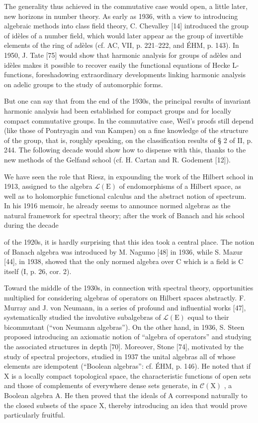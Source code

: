 The generality thus achieved in the commutative case would open, a little later, new horizons in number theory. As early as 1936, with a view to introducing algebraic methods into class field theory, C. Chevalley {[}14{]} introduced the group of idèles of a number field, which would later appear as the group of invertible elements of the ring of adèles (cf. AC, VII, p. 221--222, and ÉHM, p. 143). In 1950, J. Tate {[}75{]} would show that harmonic analysis for groups of adèles and idèles makes it possible to recover easily the functional equations of Hecke L-functions, foreshadowing extraordinary developments linking harmonic analysis on adelic groups to the study of automorphic forms.

But one can say that from the end of the 1930s, the principal results of invariant harmonic analysis had been established for compact groups and for locally compact commutative groups. In the commutative case, Weil's proofs still depend (like those of Pontryagin and van Kampen) on a fine knowledge of the structure of the group, that is, roughly speaking, on the classification results of § 2 of II, p. 244. The following decade would show how to dispense with this, thanks to the new methods of the Gelfand school (cf. H. Cartan and R. Godement {[}12{]}).


We have seen the role that Riesz, in expounding the work of the Hilbert school in 1913, assigned to the algebra \(\mathcal{L}(\mathrm{E})\) of endomorphisms of a Hilbert space, as well as to holomorphic functional calculus and the abstract notion of spectrum. In his 1916 memoir, he already seems to announce normed algebras as the natural framework for spectral theory; after the work of Banach and his school during the decade

of the 1920s, it is hardly surprising that this idea took a central place. The notion of Banach algebra was introduced by M. Nagumo {[}48{]} in 1936, while S. Mazur {[}44{]}, in 1938, showed that the only normed algebra over C which is a field is C itself (I, p. 26, cor. 2).

Toward the middle of the 1930s, in connection with spectral theory, opportunities multiplied for considering algebras of operators on Hilbert spaces abstractly. F. Murray and J. von Neumann, in a series of profound and influential works {[}47{]}, systematically studied the involutive subalgebras of \(\mathcal{L}(\mathrm{E})\) equal to their bicommutant (“von Neumann algebras”). On the other hand, in 1936, S. Steen proposed introducing an axiomatic notion of “algebra of operators” and studying the associated structures in depth {[}70{]}. Moreover, Stone {[}74{]}, motivated by the study of spectral projectors, studied in 1937 the unital algebras all of whose elements are idempotent (“Boolean algebras”: cf. ÉHM, p. 146). He noted that if X is a locally compact topological space, the characteristic functions of open sets and those of complements of everywhere dense sets generate, in \(\mathcal{C}(\mathrm{X})\) , a Boolean algebra A. He then proved that the ideals of A correspond naturally to the closed subsets of the space X, thereby introducing an idea that would prove particularly fruitful.

